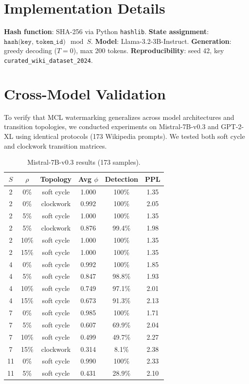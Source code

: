 \documentclass[11pt]{article}
\theoremstyle{definition}
\theoremstyle{remark}
\begin{document}
\section{Implementation Details}

\textbf{Hash function}: SHA-256 via Python \texttt{hashlib}. \textbf{State assignment}: $\texttt{hash(key, token\_id)} \mod S$. \textbf{Model}: Llama-3.2-3B-Instruct. \textbf{Generation}: greedy decoding ($T=0$), max 200 tokens. \textbf{Reproducibility}: seed 42, key \texttt{curated\_wiki\_dataset\_2024}.


\section{Cross-Model Validation}
\label{app:additional_models}

To verify that MCL watermarking generalizes across model architectures and transition topologies, we conducted experiments on Mistral-7B-v0.3 and GPT-2-XL using identical protocols (173 Wikipedia prompts). We tested both soft cycle and clockwork transition matrices.

\begin{table}[H]
\centering
\caption{Mistral-7B-v0.3 results (173 samples).}
\label{tab:mistral}
\begin{tabular}{cccccc}
\toprule
$S$ & $\rho$ & Topology & Avg $\phi$ & Detection & PPL \\
\midrule
2 & 0\% & soft cycle & 1.000 & 100\% & 1.35 \\
2 & 0\% & clockwork & 0.992 & 100\% & 2.05 \\
2 & 5\% & soft cycle & 1.000 & 100\% & 1.35 \\
2 & 5\% & clockwork & 0.876 & 99.4\% & 1.98 \\
2 & 10\% & soft cycle & 1.000 & 100\% & 1.35 \\
2 & 15\% & soft cycle & 1.000 & 100\% & 1.35 \\
4 & 0\% & soft cycle & 0.992 & 100\% & 1.85 \\
4 & 5\% & soft cycle & 0.847 & 98.8\% & 1.93 \\
4 & 10\% & soft cycle & 0.749 & 97.1\% & 2.01 \\
4 & 15\% & soft cycle & 0.673 & 91.3\% & 2.13 \\
7 & 0\% & soft cycle & 0.985 & 100\% & 1.71 \\
7 & 5\% & soft cycle & 0.607 & 69.9\% & 2.04 \\
7 & 10\% & soft cycle & 0.499 & 49.7\% & 2.27 \\
7 & 15\% & clockwork & 0.314 & 8.1\% & 2.38 \\
11 & 0\% & soft cycle & 0.990 & 100\% & 2.33 \\
11 & 5\% & soft cycle & 0.431 & 28.9\% & 2.10 \\
\bottomrule
\end{tabular}
\end{table}
\end{document}

